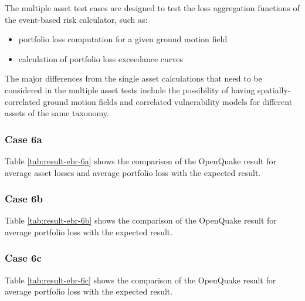 The multiple asset test cases are designed to test the loss aggregation functions of the event-based risk calculator, such as:

\begin{itemize}
\item portfolio loss computation for a given ground motion field
\item calculation of portfolio loss exceedance curves
\end{itemize}

The major differences from the single asset calculations that need to be considered in the multiple asset tests include the possibility of having spatially-correlated ground motion fields and correlated vulnerability models for different assets of the same taxonomy.

\subsubsection{Case 6a}


Table \ref{tab:result-ebr-6a} shows the comparison of the OpenQuake result for average asset losses and average portfolio loss with the expected result.

\subsubsection{Case 6b}


Table \ref{tab:result-ebr-6b} shows the comparison of the OpenQuake result for average portfolio loss with the expected result.

\subsubsection{Case 6c}


Table \ref{tab:result-ebr-6c} shows the comparison of the OpenQuake result for average portfolio loss with the expected result.

